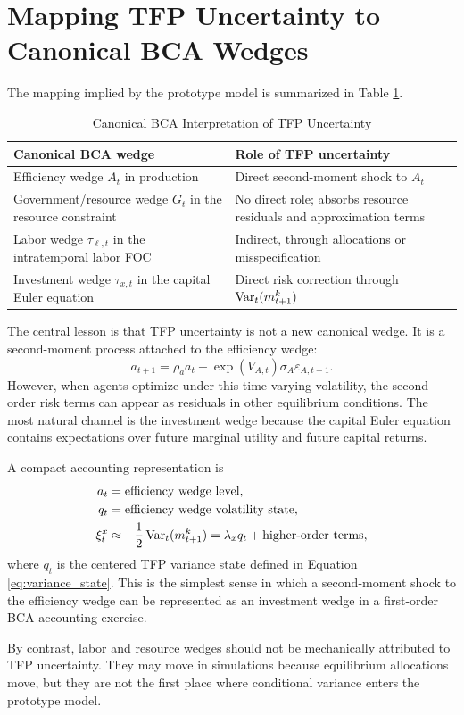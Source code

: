\section{Mapping TFP Uncertainty to Canonical BCA Wedges}

The mapping implied by the prototype model is summarized in Table
\ref{tab:bca_wedge_mapping}.

\begin{table}[htbp]
\centering
\caption{Canonical BCA Interpretation of TFP Uncertainty}
\label{tab:bca_wedge_mapping}
\begin{tabular}{p{}p{}}
\toprule
Canonical BCA wedge & Role of TFP uncertainty \\
\midrule
Efficiency wedge \(A_t\) in production
& Direct second-moment shock to \(A_t\) \\
Government/resource wedge \(G_t\) in the resource constraint
& No direct role; absorbs resource residuals and approximation terms \\
Labor wedge \(\tau_{\ell,t}\) in the intratemporal labor FOC
& Indirect, through allocations or misspecification \\
Investment wedge \(\tau_{x,t}\) in the capital Euler equation
& Direct risk correction through \(\operatorname{Var}_t(m^k_{t+1})\) \\
\bottomrule
\end{tabular}
\end{table}

The central lesson is that TFP uncertainty is not a new canonical wedge. It is a
second-moment process attached to the efficiency wedge:
\begin{equation}
    a_{t+1}
    =
    \rho_a a_t
    +
    \exp(V_{A,t})\sigma_A\varepsilon_{A,t+1}.
    \label{eq:efficiency_sv_process}
\end{equation}
However, when agents optimize under this time-varying volatility, the
second-order risk terms can appear as residuals in other equilibrium
conditions. The most natural channel is the investment wedge because the capital
Euler equation contains expectations over future marginal utility and future
capital returns.

A compact accounting representation is
\begin{align}
    a_t
    &=
    \text{efficiency wedge level},
    \label{eq:compact_efficiency}
    \\
    q_t
    &=
    \text{efficiency wedge volatility state},
    \label{eq:compact_efficiency_vol}
    \\
    \xi^x_t
    &\approx
    -\frac{1}{2}\operatorname{Var}_t(m^k_{t+1})
    =
    \lambda_x q_t+\text{higher-order terms},
    \label{eq:compact_investment_loading}
\end{align}
where \(q_t\) is the centered TFP variance state defined in Equation
\eqref{eq:variance_state}. This is the simplest sense in which a second-moment
shock to the efficiency wedge can be represented as an investment wedge in a
first-order BCA accounting exercise.

By contrast, labor and resource wedges should not be mechanically attributed to
TFP uncertainty. They may move in simulations because equilibrium allocations
move, but they are not the first place where conditional variance enters the
prototype model.
